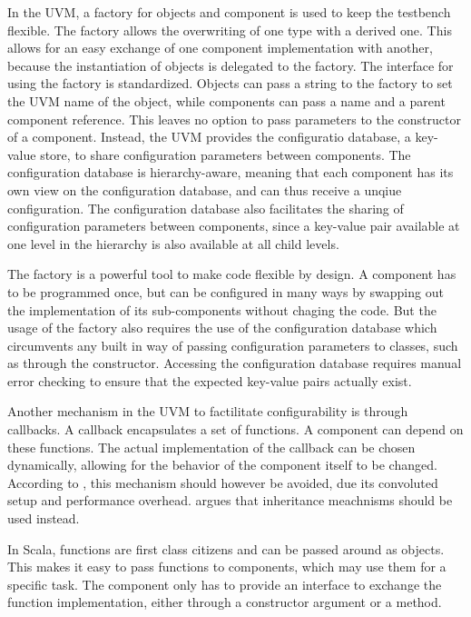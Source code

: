 In the UVM, a factory for objects and component is used to keep the testbench flexible. The factory allows the
overwriting of one type with a derived one. This allows for an easy exchange of one component implementation with
another, because the instantiation of objects is delegated to the factory. The interface for using the factory is
standardized. Objects can pass a string to the factory to set the UVM name of the object, while components can pass a
name and a parent component reference. This leaves no option to pass parameters to the constructor of a component.
Instead, the UVM provides the configuratio database, a key-value store, to share configuration parameters between
components. The configuration database is hierarchy-aware, meaning that each component has its own view on the
configuration database, and can thus receive a unqiue configuration. The configuration database also facilitates the
sharing of configuration parameters between components, since a key-value pair available at one level in the
hierarchy is also available at all child levels.

The factory is a powerful tool to make code flexible by design. A component has to be programmed once, but can be
configured in many ways by swapping out the implementation of its sub-components without chaging the code. But the
usage of the factory also requires the use of the configuration database which circumvents any built in way of
passing configuration parameters to classes, such as through the constructor. Accessing the configuration database
requires manual error checking to ensure that the expected key-value pairs actually exist.

Another mechanism in the UVM to factilitate configurability is through callbacks. A callback encapsulates a set of
functions. A component can depend on these functions. The actual implementation of the callback can be chosen
dynamically, allowing for the behavior of the component itself to be changed. According to
\citeauthor{sutherland2015uvm} \cite{sutherland2015uvm}, this mechanism should however be avoided, due its convoluted
setup and performance overhead. \citeauthor{sutherland2015uvm} argues that inheritance meachnisms should be used instead.

In Scala, functions are first class citizens and can be passed around as objects. This makes it easy to pass
functions to components, which may use them for a specific task. The component only has to provide an interface to
exchange the function implementation, either through a constructor argument or a method.

